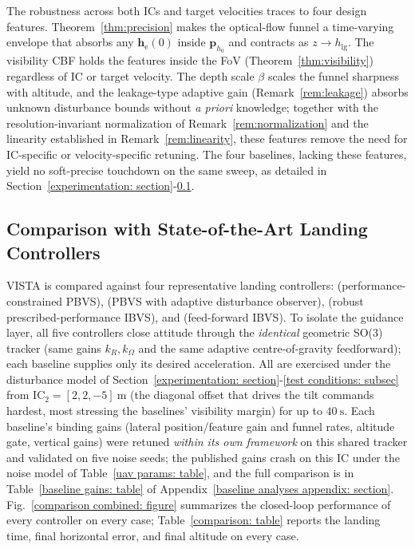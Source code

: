 \documentclass{IEEEtaes}
\theoremstyle{definition}
\theoremstyle{remark}
\begin{document}
The robustness across both ICs and target velocities traces to four design features. Theorem~\ref{thm:precision} makes the optical-flow funnel a time-varying envelope that absorbs any $\boldsymbol{h}_\text{e}(0)$ inside $\boldsymbol{p}_{h_0}$ and contracts as $z\to h_\text{lg}$. The visibility CBF holds the features inside the FoV (Theorem~\ref{thm:visibility}) regardless of IC or target velocity. The depth scale $\beta$ scales the funnel sharpness with altitude, and the leakage-type adaptive gain (Remark~\ref{rem:leakage}) absorbs unknown disturbance bounds without \emph{a priori} knowledge; together with the resolution-invariant normalization of Remark~\ref{rem:normalization} and the linearity established in Remark~\ref{rem:linearity}, these features remove the need for IC-specific or velocity-specific retuning. The four baselines, lacking these features, yield no soft-precise touchdown on the same sweep, as detailed in Section~\ref{experimentation: section}-\ref{comparison: subsec}.

\subsection{Comparison with State-of-the-Art Landing Controllers}
\label{comparison: subsec}
VISTA is compared against four representative landing controllers: \cite{lin2022} (performance-constrained PBVS), \cite{zhang2026} (PBVS with adaptive disturbance observer), \cite{lin2023} (robust prescribed-performance IBVS), and \cite{cho2022} (feed-forward IBVS). To isolate the guidance layer, all five controllers close attitude through the \emph{identical} geometric SO(3) tracker (same gains $k_R,k_\Omega$ and the same adaptive centre-of-gravity feedforward); each baseline supplies only its desired acceleration. All are exercised under the disturbance model of Section~\ref{experimentation: section}-\ref{test conditions: subsec} from IC$_2=[2,2,-5]~\text{m}$ (the diagonal offset that drives the tilt commands hardest, most stressing the baselines' visibility margin) for up to $40~\text{s}$. Each baseline's binding gains (lateral position/feature gain and funnel rates, altitude gate, vertical gains) were retuned \emph{within its own framework} on this shared tracker and validated on five noise seeds; the published gains crash on this IC under the noise model of Table~\ref{uav params: table}, and the full comparison is in Table~\ref{baseline gains: table} of Appendix~\ref{baseline analyses appendix: section}. Fig.~\ref{comparison combined: figure} summarizes the closed-loop performance of every controller on every case; Table~\ref{comparison: table} reports the landing time, final horizontal error, and final altitude on every case.
\end{document}
